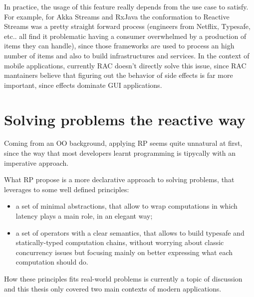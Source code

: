 In practice, the usage of this feature really depends from the use case
to satisfy. For example, for Akka Streams and RxJava the conformation to
Reactive Streams was a pretty straight forward process (engineers from
Netflix, Typesafe, etc.. all find it problematic having a consumer
overwhelmed by a production of items they can handle), since those
frameworks are used to process an high number of items and also to build
infrastructures and services. In the context of mobile applications,
currently RAC doesn't directly solve this issue, since RAC mantainers
believe that figuring out the behavior of side effects is far more
important, since effects dominate GUI applications.

\section{Solving problems the reactive
way}\label{solving-problems-the-reactive-way}

Coming from an OO background, applying RP seems quite unnatural at
first, since the way that most developers learnt programming is
tipycally with an imperative approach.

What RP propose is a more declarative approach to solving problems, that
leverages to some well defined principles:

\begin{itemize}
\itemsep1pt\parskip0pt
\item
  a set of minimal abstractions, that allow to wrap computations in
  which latency plays a main role, in an elegant way;
\item
  a set of operators with a clear semantics, that allows to build
  typesafe and statically-typed computation chains, without worrying
  about classic concurrency issues but focusing mainly on better
  expressing what each computation should do.
\end{itemize}

How these principles fits real-world problems is currently a topic of
discussion and this thesis only covered two main contexts of modern
applications.

